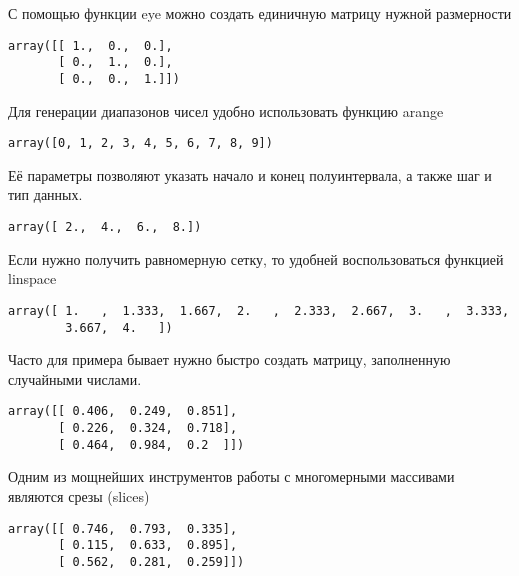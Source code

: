 \documentclass{article}
\begin{document}
    

    С помощью функции eye можно создать единичную матрицу нужной размерности

    
    
    \begin{verbatim}
array([[ 1.,  0.,  0.],
       [ 0.,  1.,  0.],
       [ 0.,  0.,  1.]])
    \end{verbatim}

    

    Для генерации диапазонов чисел удобно использовать функцию arange

    
    
    \begin{verbatim}
array([0, 1, 2, 3, 4, 5, 6, 7, 8, 9])
    \end{verbatim}

    

    Её параметры позволяют указать начало и конец полуинтервала, а также шаг
и тип данных.

    
    
    \begin{verbatim}
array([ 2.,  4.,  6.,  8.])
    \end{verbatim}

    

    Если нужно получить равномерную сетку, то удобней воспользоваться
функцией linspace

    
    
    \begin{verbatim}
array([ 1.   ,  1.333,  1.667,  2.   ,  2.333,  2.667,  3.   ,  3.333,
        3.667,  4.   ])
    \end{verbatim}

    

    Часто для примера бывает нужно быстро создать матрицу, заполненную
случайными числами.

    
    
    \begin{verbatim}
array([[ 0.406,  0.249,  0.851],
       [ 0.226,  0.324,  0.718],
       [ 0.464,  0.984,  0.2  ]])
    \end{verbatim}

    

    Одним из мощнейших инструментов работы с многомерными массивами являются
срезы (slices)

    
    
    \begin{verbatim}
array([[ 0.746,  0.793,  0.335],
       [ 0.115,  0.633,  0.895],
       [ 0.562,  0.281,  0.259]])
    \end{verbatim}
\end{document}
